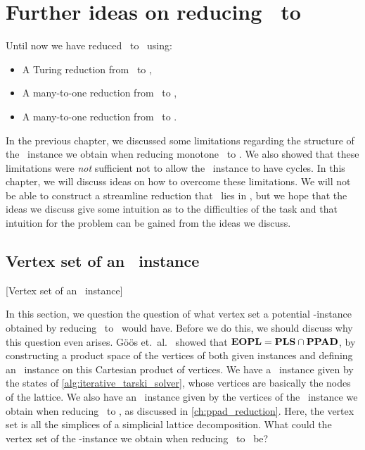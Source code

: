 \setchapterpreamble[u]{\margintoc}
\chapter{Further ideas on reducing \Tarski\ to \EOPL}\label{ch:further_ideas}

Until now we have reduced \Tarski\ to \EndOfLine\ using:
\begin{itemize}
	\item A Turing reduction from \Tarski\ to \Tarskistar,
	\item A many-to-one reduction from \Tarskistar\ to \Sperner,
	\item A many-to-one reduction from \Sperner\ to \EndOfLine.
\end{itemize}
In the previous chapter, we discussed some limitations regarding the structure of the \Sperner\ instance we obtain when reducing monotone \Tarskistar\ to \Sperner. We also showed that these limitations were \emph{not} sufficient not to allow the \EndOfLine\ instance to have cycles. In this chapter, we will discuss ideas on how to overcome these limitations. We will not be able to construct a streamline reduction that \Tarski\ lies in \EOPL, but we hope that the ideas we discuss give some intuition as to the difficulties of the task and that intuition for the problem can be gained from the ideas we discuss.

\section{Vertex set of an \EOPL\ instance}[Vertex set of an \EOPL\ instance]

In this section, we question the question of what vertex set a potential \EOPL-instance obtained by reducing \Tarskistar\ to \EndOfPotentialLine\ would have. Before we do this, we should discuss why this question even arises. Göös et.\ al.~ showed that $\textbf{EOPL} = \textbf{PLS} \cap \textbf{PPAD}$, by constructing a product space of the vertices of both given instances and defining an \EndOfPotentialLine\ instance on this Cartesian product of vertices. We have a \Localopt\ instance given by the states of \cref{alg:iterative_tarski_solver}, whose vertices are basically the nodes of the lattice. We also have an \EndOfLine\ instance given by the vertices of the \Sperner\ instance we obtain when reducing \Tarskistar\ to \Sperner, as discussed in \cref{ch:ppad_reduction}. Here, the vertex set is all the simplices of a simplicial lattice decomposition. What could the vertex set of the \EndOfPotentialLine-instance we obtain when reducing \Tarskistar\ to \EndOfLine\ be?


